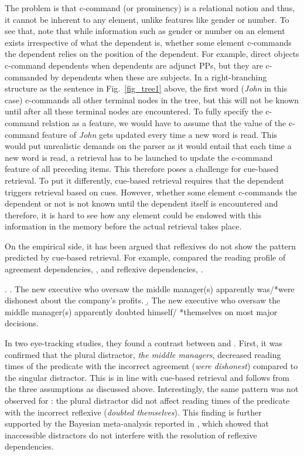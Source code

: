 \documentclass[11pt]{article} %
\begin{document}
The problem is that c-command (or prominency) is a relational notion and thus, it cannot be inherent to any element, unlike features like gender or number. To see that, note that while information such as gender or number on an element exists irrespective of what the dependent is, whether some element c-commands the dependent relies on the position of the dependent. For example, direct objects c-command dependents when dependents are adjunct PPs, but they are c-commanded by dependents when these are subjects. In a right-branching structure as the sentence in Fig.~\ref{fig_tree1} above, the first word (\emph{John} in this case) c-commands all other terminal nodes in the tree, but this will not be known until after all these terminal nodes are encountered. To fully specify the c-command relation as a feature, we would have to assume that the value of the c-command feature of \emph{John} gets updated every time a new word is read. This would put unrealistic demands on the parser as it would entail that each time a new word is read, a retrieval has to be launched to update the c-command feature of all preceding items. This therefore poses a challenge for cue-based retrieval. To put it differently, cue-based retrieval requires that the dependent triggers retrieval based on cues. However, whether some element c-commands the dependent or not is not known until the dependent itself is encountered and therefore, it is hard to see how any element could be endowed with this information in the memory before the actual retrieval takes place.

On the empirical side, it has been argued that reflexives do not show the pattern predicted by cue-based retrieval. For example, \cite{dillon+13} compared the reading profile of agreement dependencies, \Next[a], and reflexive dependencies, \Next[b].

\ex. \a. The new executive who oversaw the middle manager(s) apparently was/*were dishonest about the company's profits.
\b. The new executive who oversaw the middle manager(s) apparently doubted himself/
*themselves on most major decisions.

In two eye-tracking studies, they found a contrast between \Last[a] and \Last[b]. First, it was confirmed that the plural distractor, \textit{the middle managers}, decreased reading times of the predicate with the incorrect agreement (\textit{were dishonest}) compared to the singular distractor. This is in line with cue-based retrieval and follows from the three assumptions as discussed above. Interestingly, the same pattern was not observed for \Last[b]: the plural distractor did not affect reading times of the predicate with the incorrect reflexive (\textit{doubted themselves}). This finding is further supported by the Bayesian meta-analysis reported in \cite{jager+17}, which showed that inaccessible distractors do not interfere with the resolution of reflexive dependencies.
\end{document}
